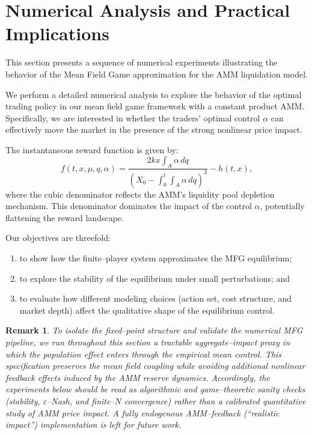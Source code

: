 \documentclass[11pt]{article}
\newtheorem*{obs*}{Remark}
\theoremstyle{definition}
\begin{document}
\section{Numerical Analysis and Practical Implications}
\label{sec:numerics}
This section presents a sequence of numerical experiments illustrating the behavior of the Mean Field Game approximation for the AMM liquidation model.

We perform a detailed numerical analysis to explore the behavior of the optimal trading policy in our mean field game framework with a constant product AMM. Specifically, we are interested in whether the traders' optimal control $\alpha$ can effectively move the market in the presence of the strong nonlinear price impact.

The instantaneous reward function is given by:
\[
f(t,x,\mu,q,\alpha) = \frac{2kx \int_A \alpha\,dq}{\left(X_0 - \int_0^t \int_A \alpha\,dq\right)^3} - h(t,x),
\]
where the cubic denominator reflects the AMM's liquidity pool depletion mechanism. This denominator dominates the impact of the control $\alpha$, potentially flattening the reward landscape.


Our objectives are threefold: 
\begin{enumerate}
    \item to show how the finite--player system approximates the MFG equilibrium; 
    \item to explore the stability of the equilibrium under small perturbations; and 
    \item to evaluate how different modeling choices (action set, cost structure, and market depth) affect the qualitative shape of the equilibrium control.
\end{enumerate}

\begin{obs*}
To isolate the fixed--point structure and validate the numerical MFG pipeline, we run throughout this section a tractable aggregate--impact proxy in which the population effect enters through the empirical mean control. This specification preserves the mean field coupling while avoiding additional nonlinear feedback effects induced by the AMM reserve dynamics. Accordingly, the experiments below should be read as algorithmic and game--theoretic sanity checks (stability, $\varepsilon$--Nash, and finite--$N$ convergence) rather than a calibrated quantitative study of AMM price impact. A fully endogenous AMM--feedback (``realistic impact'') implementation is left for future work.
\end{obs*}
\end{document}
